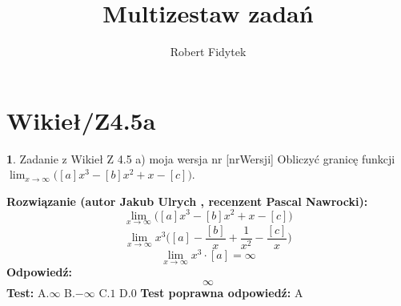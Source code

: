 \documentclass[12pt, a4paper]{article}
\title{Multizestaw zadań}
\author{Robert Fidytek}
\date{}
\theoremstyle{definition} %
\newtheorem{zad}{}
\newcommand{\kategoria}[1]{\section{#1}} %
\newcommand{\zadStart}[1]{\begin{zad}#1\newline} %
\newcommand{\zadStop}{\end{zad}}   %
\newcommand{\rozwStart}[2]{\noindent \textbf{Rozwiązanie (autor #1 , recenzent #2): }\newline} %
\newcommand{\rozwStop}{\newline}                                            %
\newcommand{\odpStart}{\noindent \textbf{Odpowiedź:}\newline}    %
\newcommand{\odpStop}{\newline}                                             %
\newcommand{\testStart}{\noindent \textbf{Test:}\newline} %
\newcommand{\testStop}{\newline} %
\newcommand{\kluczStart}{\noindent \textbf{Test poprawna odpowiedź:}\newline} %
\newcommand{\kluczStop}{\newline} %
\begin{document}
\maketitle


\kategoria{Wikieł/Z4.5a}
\zadStart{Zadanie z Wikieł Z 4.5 a) moja wersja nr [nrWersji]}
Obliczyć granicę funkcji $\lim_{x \to \infty}\big([a]x^{3}-[b]x^{2}+x-[c]\big)$.
\zadStop
\rozwStart{Jakub Ulrych}{Pascal Nawrocki}
$$\lim_{x \to \infty}\big([a]x^{3}-[b]x^{2}+x-[c]\big)$$
$$\lim_{x \to \infty}x^{3}\big([a]-\frac{[b]}{x}+\frac{1}{x^2}-\frac{[c]}{x}\big)$$
$$\lim_{x \to \infty}x^{3}\cdot[a]=\infty$$
\rozwStop
\odpStart
$$\infty$$
\odpStop
\testStart
A.$\infty$
B.$-\infty$
C.$1$
D.$0$
\testStop
\kluczStart
A
\kluczStop
\end{document}
